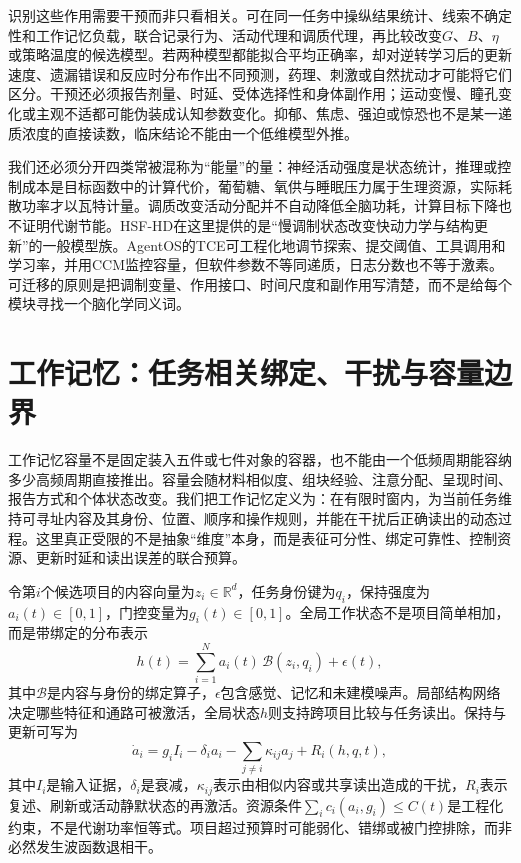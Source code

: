 识别这些作用需要干预而非只看相关。可在同一任务中操纵结果统计、线索不确定性和工作记忆负载，联合记录行为、活动代理和调质代理，再比较改变$G$、$B$、$\eta$或策略温度的候选模型。若两种模型都能拟合平均正确率，却对逆转学习后的更新速度、遗漏错误和反应时分布作出不同预测，药理、刺激或自然扰动才可能将它们区分。干预还必须报告剂量、时延、受体选择性和身体副作用；运动变慢、瞳孔变化或主观不适都可能伪装成认知参数变化。抑郁、焦虑、强迫或惊恐也不是某一递质浓度的直接读数，临床结论不能由一个低维模型外推。

我们还必须分开四类常被混称为“能量”的量：神经活动强度是状态统计，推理或控制成本是目标函数中的计算代价，葡萄糖、氧供与睡眠压力属于生理资源，实际耗散功率才以瓦特计量。调质改变活动分配并不自动降低全脑功耗，计算目标下降也不证明代谢节能。HSF-HD在这里提供的是“慢调制状态改变快动力学与结构更新”的一般模型族。AgentOS的TCE可工程化地调节探索、提交阈值、工具调用和学习率，并用CCM监控容量，但软件参数不等同递质，日志分数也不等于激素。可迁移的原则是把调制变量、作用接口、时间尺度和副作用写清楚，而不是给每个模块寻找一个脑化学同义词。

\section{工作记忆：任务相关绑定、干扰与容量边界}
\label{sec:phase_bottleneck_and_dimensional_horizon}

工作记忆容量不是固定装入五件或七件对象的容器，也不能由一个低频周期能容纳多少高频周期直接推出。容量会随材料相似度、组块经验、注意分配、呈现时间、报告方式和个体状态改变。我们把工作记忆定义为：在有限时窗内，为当前任务维持可寻址内容及其身份、位置、顺序和操作规则，并能在干扰后正确读出的动态过程。这里真正受限的不是抽象“维度”本身，而是表征可分性、绑定可靠性、控制资源、更新时延和读出误差的联合预算。

令第$i$个候选项目的内容向量为$z_i\in\mathbb R^d$，任务身份键为$q_i$，保持强度为$a_i(t)\in[0,1]$，门控变量为$g_i(t)\in[0,1]$。全局工作状态不是项目简单相加，而是带绑定的分布表示
\begin{equation}
 h(t)=\sum_{i=1}^{N}a_i(t)\,\mathcal B(z_i,q_i)+\epsilon(t),
\end{equation}
其中$\mathcal B$是内容与身份的绑定算子，$\epsilon$包含感觉、记忆和未建模噪声。局部结构网络决定哪些特征和通路可被激活，全局状态$h$则支持跨项目比较与任务读出。保持与更新可写为
\begin{equation}
 \dot a_i=g_i I_i-\delta_i a_i-\sum_{j\ne i}\kappa_{ij}a_j+R_i(h,q,t),
\end{equation}
其中$I_i$是输入证据，$\delta_i$是衰减，$\kappa_{ij}$表示由相似内容或共享读出造成的干扰，$R_i$表示复述、刷新或活动静默状态的再激活。资源条件$\sum_i c_i(a_i,g_i)\le C(t)$是工程化约束，不是代谢功率恒等式。项目超过预算时可能弱化、错绑或被门控排除，而非必然发生波函数退相干。

